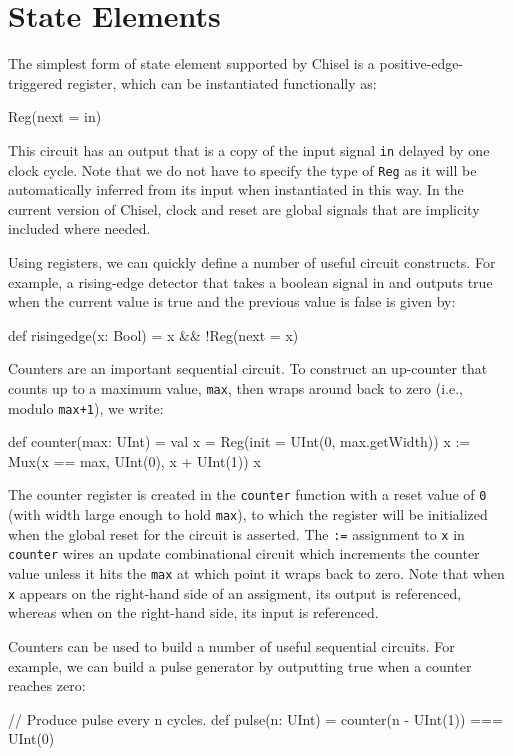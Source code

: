 \documentclass[twocolumn,10pt]{article}
\begin{document}
\section{State Elements}
\label{sec:sequential}


The simplest form of state element supported by Chisel is a
positive-edge-triggered register, which can be instantiated
functionally as:
\begin{scala}
Reg(next = in)
\end{scala}

\noindent
This circuit has an output that is a copy of the input signal \verb+in+
delayed by one clock cycle.  Note that we do not have to specify the
type of \verb+Reg+ as it will be automatically inferred from its input
when instantiated in this way.  In the current version of Chisel,
clock and reset are global signals that are implicity included where
needed.

Using registers, we can quickly define a number of useful circuit
constructs.  For example, a rising-edge detector that takes a boolean
signal in and outputs true when the current value is true and the
previous value is false is given by:
\begin{scala}
def risingedge(x: Bool) = x && !Reg(next = x)
\end{scala}

Counters are an important sequential circuit.  To construct an
up-counter that counts up to a maximum value, \verb+max+, then wraps
around back to zero (i.e., modulo \verb!max+1!), we write:
\begin{scala}
def counter(max: UInt) = {
  val x = Reg(init = UInt(0, max.getWidth))
  x := Mux(x == max, UInt(0), x + UInt(1))
  x
}
\end{scala}

\noindent
The counter register is created in the \verb!counter! function 
with a reset value of \verb!0! (with width large enough to hold \verb+max+),
to which the register will be initialized when the global reset for the circuit is asserted.
The \verb!:=! assignment to \verb!x! in \verb!counter! wires an update combinational circuit 
which increments the counter value unless it hits the \verb+max+ at which point it wraps back to zero.
Note that when \verb!x! appears on the right-hand side of
an assigment, its output is referenced, whereas when on the right-hand
side, its input is referenced.

Counters can be used to build a number of useful sequential circuits.
For example, we can build a pulse generator by outputting true when
a counter reaches zero:
\begin{scala}
// Produce pulse every n cycles.
def pulse(n: UInt) = counter(n - UInt(1)) === UInt(0)
\end{scala}
\end{document}
